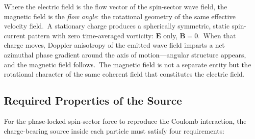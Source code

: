 ﻿\documentclass[12pt,letterpaper]{article}
\begin{document}
Where the electric field is the flow vector of the spin-sector wave field, the
magnetic field is the \emph{flow angle}: the rotational geometry of the same
effective velocity field.\ A stationary charge produces a spherically
symmetric, static spin-current pattern with zero time-averaged vorticity:
$\mathbf{E}$ only, $\mathbf{B} = 0$.\ When that charge moves, Doppler
anisotropy of the emitted wave field imparts a net azimuthal phase gradient
around the axis of motion---angular structure appears, and the magnetic field
follows.\ The magnetic field is not a separate entity but the rotational
character of the same coherent field that constitutes the electric field.


\subsection{Required Properties of the Source}
\label{sec:ring-axial-mode}

For the phase-locked spin-sector force to reproduce the Coulomb interaction,
the charge-bearing source inside each particle must satisfy four
requirements:
\end{document}
